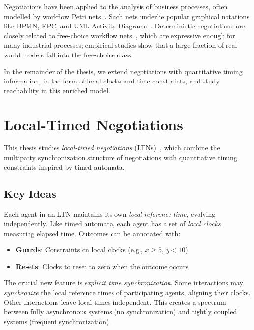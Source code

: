 Negotiations have been applied to the analysis of business processes, often modelled by workflow Petri nets~\cite{EsparzaWorkflow}. Such nets underlie popular graphical notations like BPMN, EPC, and UML Activity Diagrams~\cite{DijkmanBPMN}. Deterministic negotiations are closely related to free-choice workflow nets~\cite{EsparzaFreeChoice}, which are expressive enough for many industrial processes; empirical studies show that a large fraction of real-world models fall into the free-choice class.

In the remainder of the thesis, we extend negotiations with quantitative timing information, in the form of local clocks and time constraints, and study reachability in this enriched model.


\section{Local-Timed Negotiations}

This thesis studies \emph{local-timed negotiations} (LTNs)~\cite{LTNOriginal}, which combine the multiparty synchronization structure of negotiations with quantitative timing constraints inspired by timed automata.

\subsection{Key Ideas}

Each agent in an LTN maintains its own \emph{local reference time}, evolving independently. Like timed automata, each agent has a set of \emph{local clocks} measuring elapsed time. Outcomes can be annotated with:
\begin{itemize}
\item \textbf{Guards}: Constraints on local clocks (e.g., $x \geq 5$, $y < 10$)
\item \textbf{Resets}: Clocks to reset to zero when the outcome occurs
\end{itemize}

The crucial new feature is \emph{explicit time synchronization}. Some interactions may \emph{synchronize} the local reference times of participating agents, aligning their clocks. Other interactions leave local times independent. This creates a spectrum between fully asynchronous systems (no synchronization) and tightly coupled systems (frequent synchronization).


